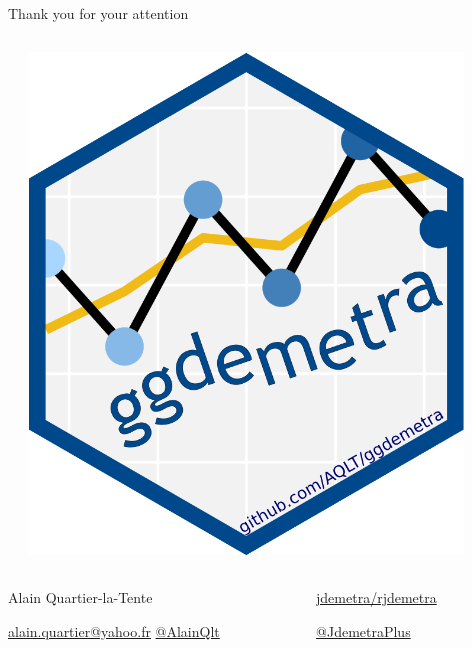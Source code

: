\documentclass[10pt,xcolor=table,color={dvipsnames,usenames},ignorenonframetext,usepdftitle=false,french]{beamer}
\begin{document}
\begin{frame}{Thank you for your attention}
\begin{columns}
\begin{column}{0.33\textwidth}
\begin{center}
\end{center}
\end{column}
\begin{column}{0.33\textwidth} 
\begin{center}
\includegraphics[width=0.9\textwidth]{img/ggdemetra_logo.png}
\end{center}
\end{column}
\end{columns}

\bigskip
\bigskip

\begin{columns}
\begin{column}{0.5\textwidth}
Alain Quartier-la-Tente

\href{mailto:alain.quartier@yahoo.fr}{\faEnvelope{} alain.quartier@yahoo.fr} 
\href{https://twitter.com/AlainQlt}{\faTwitter{} @AlainQlt}
\end{column}
\begin{column}{0.5\textwidth} 
\href{https://github.com/jdemetra/rjdemetra}{\faGithub{} jdemetra/rjdemetra}  

\href{https://twitter.com/JDemetraPlus}{\faTwitter{} @JdemetraPlus}

\end{column}
\end{columns}

\end{frame}
\end{document}

